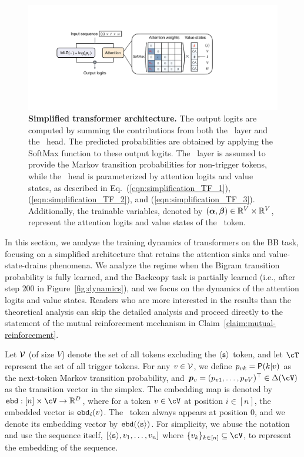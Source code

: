 \begin{figure}[t]
    \centering
    \includegraphics[width=0.7\linewidth]{Figures/BBM/SimpleModel.pdf}
    \caption{\small \textbf{Simplified transformer architecture.} The output logits are computed by summing the contributions from both the \mlp~layer and the \attn~head. The predicted probabilities are obtained by applying the SoftMax function to these output logits. The \mlp~layer is assumed to provide the Markov transition probabilities for non-trigger tokens, while the \attn~head is parameterized by attention logits and value states, as described in Eq.~(\ref{eqn:simplification_TF_1}), (\ref{eqn:simplification_TF_2}), and (\ref{eqn:simplification_TF_3}). Additionally, the trainable variables, denoted by $(\bm{\alpha},\boldsymbol{\beta}) \in \mathbb{R}^V \times \mathbb{R}^V$, represent the attention logits and value states of the \bos~token.}
    \label{figure:simple-model}
\end{figure}

In this section, we analyze the training dynamics of transformers on the BB task, focusing on a simplified architecture that retains the attention sinks and value-state-drains phenomena. We analyze the regime when the Bigram transition probability is fully learned, and the Backcopy task is partially learned (i.e., after step $200$ in Figure~\ref{fig:dynamics}), and we focus on the dynamics of the attention logits and value states. Readers who are more interested in the results than the theoretical analysis can skip the detailed analysis and proceed directly to the statement of the mutual reinforcement mechanism in Claim~\ref{claim:mutual-reinforcement}. 

Let $\mathcal{V}$ (of size $V$) denote the set of all tokens excluding the $\texttt{$\langle \texttt{s}\rangle$}$ token, and let $\cT$ represent the set of all trigger tokens. For any  $v \in \mathcal{V}$, we define $p_{vk}={\sf P}(k|v)$ as the next-token Markov transition probability, and $\bm{\transition}_v = (p_{v1}, \ldots, p_{vV})^\top \in \Delta(\cV)$ as the transition vector in the simplex. The embedding map is denoted by $\embd: [n] \times \cV \to \R^D$, where for a token $v \in \cV$ at position $i \in [n]$, the embedded vector is ${\tt ebd}_i(v)$. The \bos~token always appears at position $0$, and we denote its embedding vector by ${\tt ebd}(\texttt{$\langle \texttt{s}\rangle$})$. For simplicity, we abuse the notation and use the sequence itself, $[\texttt{$\langle \texttt{s}\rangle$}, v_1, \ldots, v_n]$ where $\{ \tok_{k} \}_{k \in [n]} \subseteq \cV$, to represent the embedding of the sequence. 

